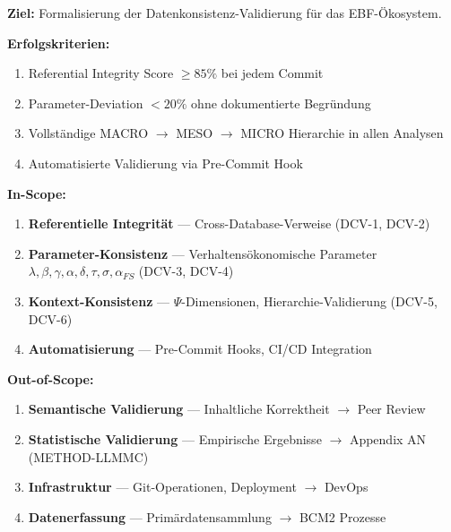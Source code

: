\begin{tcolorbox}[colback=purple!5!white, colframe=purple!75!black, title=Appendix Scope:]

\textbf{Ziel:} Formalisierung der Datenkonsistenz-Validierung für das EBF-Ökosystem.

\vspace{0.3em}
\textbf{Erfolgskriterien:}
\begin{enumerate}[label=\textbf{Z\arabic*}:, leftmargin=2cm]
    \item Referential Integrity Score $\geq 85\%$ bei jedem Commit
    \item Parameter-Deviation $< 20\%$ ohne dokumentierte Begründung
    \item Vollständige MACRO $\to$ MESO $\to$ MICRO Hierarchie in allen Analysen
    \item Automatisierte Validierung via Pre-Commit Hook
\end{enumerate}

\vspace{0.3em}
\textbf{In-Scope:}
\begin{enumerate}[label=\textbf{IS\arabic*}:, leftmargin=2cm]
    \item \textbf{Referentielle Integrität} --- Cross-Database-Verweise (DCV-1, DCV-2)
    \item \textbf{Parameter-Konsistenz} --- Verhaltensökonomische Parameter $\lambda, \beta, \gamma, \alpha, \delta, \tau, \sigma, \alpha_{FS}$ (DCV-3, DCV-4)
    \item \textbf{Kontext-Konsistenz} --- $\Psi$-Dimensionen, Hierarchie-Validierung (DCV-5, DCV-6)
    \item \textbf{Automatisierung} --- Pre-Commit Hooks, CI/CD Integration
\end{enumerate}

\vspace{0.3em}
\textbf{Out-of-Scope:}
\begin{enumerate}[label=\textbf{OS\arabic*}:, leftmargin=2cm]
    \item \textbf{Semantische Validierung} --- Inhaltliche Korrektheit $\to$ Peer Review
    \item \textbf{Statistische Validierung} --- Empirische Ergebnisse $\to$ Appendix AN (METHOD-LLMMC)
    \item \textbf{Infrastruktur} --- Git-Operationen, Deployment $\to$ DevOps
    \item \textbf{Datenerfassung} --- Primärdatensammlung $\to$ BCM2 Prozesse
\end{enumerate}


\end{tcolorbox}
